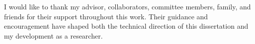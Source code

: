 I would like to thank my advisor, collaborators, committee members, family, and friends for their support throughout this work. Their guidance and encouragement have shaped both the technical direction of this dissertation and my development as a researcher.
